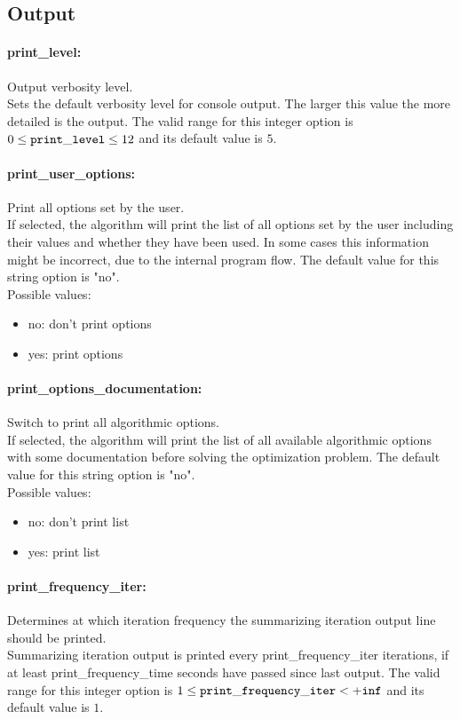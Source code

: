 \subsection{Output}

\paragraph{print\_level:}\label{opt:print_level} Output verbosity level. \\
 Sets the default verbosity level for console
output. The larger this value the more detailed
is the output. The valid range for this integer option is
$0 \le {\tt print\_level } \le 12$
and its default value is $5$.


\paragraph{print\_user\_options:}\label{opt:print_user_options} Print all options set by the user. \\
 If selected, the algorithm will print the list of
all options set by the user including their
values and whether they have been used.  In some
cases this information might be incorrect, due to
the internal program flow. The default value for this string option is "no".
\\ 
Possible values:
\begin{itemize}
   \item no: don't print options
   \item yes: print options
\end{itemize}

\paragraph{print\_options\_documentation:}\label{opt:print_options_documentation} Switch to print all algorithmic options. \\
 If selected, the algorithm will print the list of
all available algorithmic options with some
documentation before solving the optimization
problem. The default value for this string option is "no".
\\ 
Possible values:
\begin{itemize}
   \item no: don't print list
   \item yes: print list
\end{itemize}

\paragraph{print\_frequency\_iter:}\label{opt:print_frequency_iter} Determines at which iteration frequency the summarizing iteration output line should be printed. \\
 Summarizing iteration output is printed every
print\_frequency\_iter iterations, if at least
print\_frequency\_time seconds have passed since
last output. The valid range for this integer option is
$1 \le {\tt print\_frequency\_iter } <  {\tt +inf}$
and its default value is $1$.


